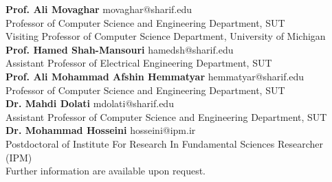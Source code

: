 \documentclass[11pt]{article}
\begin{document}
\textbf{Prof. Ali Movaghar} \href{https://scholar.google.com/citations?user=BXNelwwAAAAJ\&hl=en}{\small \faExternalLink} \hfill movaghar@sharif.edu\\
Professor of Computer Science and Engineering Department, SUT \\
Visiting Professor of Computer Science Department, University of Michigan\\
\textbf{Prof. Hamed Shah-Mansouri} \href{https://scholar.google.com/citations?user=dcjIFccAAAAJ&hl=en&oi=ao}{\small \faExternalLink} \hfill  hamedsh@sharif.edu\\
Assistant Professor of Electrical Engineering Department, SUT\\
\textbf{Prof. Ali Mohammad Afshin Hemmatyar} \href{https://scholar.google.com/citations?user=wob0AskAAAAJ&hl=en&oi=ao}{\small \faExternalLink}  \hfill hemmatyar@sharif.edu\\
Professor of Computer Science and Engineering Department, SUT\\
\textbf{Dr. Mahdi Dolati} \href{https://scholar.google.com/citations?user=b7A2CXYAAAAJ&hl=en&oi=ao}{\small \faExternalLink} \hfill  mdolati@sharif.edu\\ Assistant Professor of Computer Science and Engineering Department, SUT \\
\textbf{Dr. Mohammad Hosseini} \href{https://scholar.google.com/citations?user=iRO-DVoAAAAJ&hl=en&oi=ao}{\small \faExternalLink} \hfill  hosseini@ipm.ir \\ Postdoctoral of Institute For Research In Fundamental Sciences Researcher (IPM)\\
\vfill
Further information are available upon request.
\end{document}
